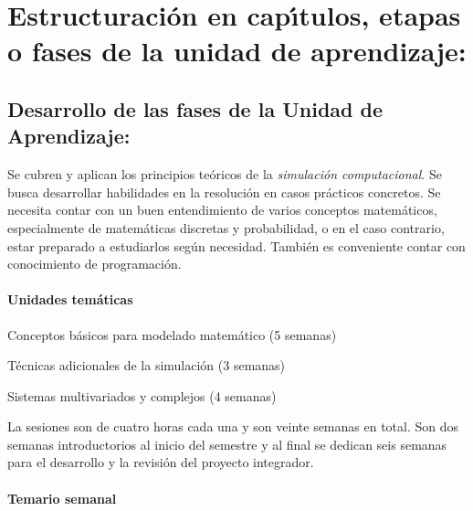 \section{Estructuraci\'{o}n en cap\'{\i}tulos, etapas o fases de la unidad de
  aprendizaje:}
\subsection{Desarrollo de las fases de la Unidad de Aprendizaje:}

\quad

Se cubren y aplican los principios te\'{o}ricos de la {\em
  simulaci\'{o}n computacional}. Se busca desarrollar habilidades en
la resoluci\'{o}n en casos pr\'{a}cticos concretos. Se necesita contar
con un buen entendimiento de varios conceptos matem\'{a}ticos,
especialmente de matem\'{a}ticas discretas y probabilidad, o en el
caso contrario, estar preparado a estudiarlos seg\'{u}n
necesidad. Tambi\'{e}n es conveniente contar con conocimiento de
programaci\'{o}n.

\paragraph{Unidades tem\'{a}ticas}

\begin{description}[itemsep=-3pt]
\item[UT1] Conceptos b\'{a}sicos para modelado matem\'{a}tico (5 semanas)
\item[UT2] T\'{e}cnicas adicionales de la simulaci\'{o}n (3 semanas)
\item[UT3] Sistemas multivariados y complejos (4 semanas)
\end{description}

La sesiones son de cuatro horas cada una y son veinte semanas en
total. Son dos semanas introductorios al inicio del semestre y al
final se dedican seis semanas para el desarrollo y la revisi\'{o}n del
proyecto integrador.

\newpage

\paragraph{Temario semanal}

\quad


